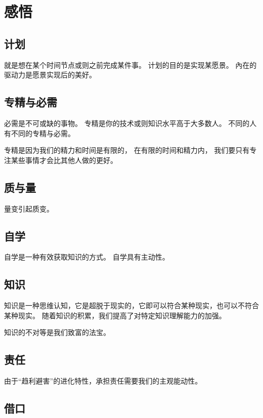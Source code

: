 
\chapter{感悟}


\section{计划}

就是想在某个时间节点或则之前完成某件事。
计划的目的是实现某愿景。
內在的驱动力是愿景实现后的美好。

\section{专精与必需}


必需是不可或缺的事物。
专精是你的技术或则知识水平高于大多数人。
不同的人有不同的专精与必需。


专精是因为我们的精力和时间是有限的，
在有限的时间和精力内，
我们要只有专注某些事情才会比其他人做的更好。


\section{质与量}


量变引起质变。

\section{自学}


自学是一种有效获取知识的方式。
自学具有主动性。



\section{知识}


知识是一种思维认知，它是超脱于现实的，它即可以符合某种现实，也可以不符合某种现实。
随着知识的积累，我们提高了对特定知识理解能力的加强。


知识的不对等是我们致富的法宝。


\section{责任}

由于“趋利避害”的进化特性，承担责任需要我们的主观能动性。


\section{借口}

